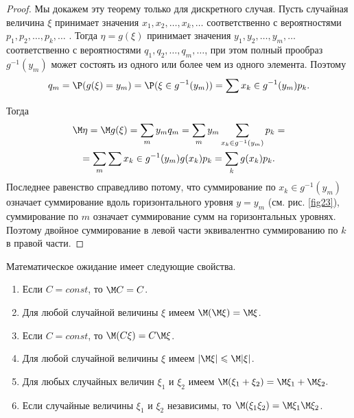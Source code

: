 \begin{proof}
	Мы докажем эту теорему только для дискретного случая.
Пусть случайная величина $\xi$ принимает значения $x_1, x_2,\dots, x_k, \dots$ соответственно с вероятностями $p_1, p_2,\dots , p_k,\dots$ . Тогда $\eta= g(\xi)$ принимает
значения $y_1, y_2, \dots , y_m, \dots$ соответственно с вероятностями $q_1, q_2,\dots, q_m,\dots $, при этом полный прообраз $g^{−1}(y_m)$ может состоять из одного или более чем из одного элемента. Поэтому
	\begin{equation*}
		q_m=\P(g(\xi)=y_m)=\P(\xi\in g^{-1}(y_m))=\sum\limits
		{x_k\in g^{-1}(y_m)}p_k.
	\end{equation*}

	Тогда
	\begin{gather*}
	\M\eta=\M g(\xi)=\sum_m y_mq_m=\sum_m y_m \sum
	\limits_{x_k\in g^{-1}(y_m)} p_k=\\=
	\sum_m\sum\limits{x_k\in g^{-1}(y_m)}g(x_k)p_k=\sum_kg(x_k)p_k.
	\end{gather*}
	Последнее равенство справедливо потому, что суммирование по $x_k\in g^{-1}(y_m)$ означает суммирование вдоль горизонтального уровня $y = y_m$ (см. рис. \ref{fig23}), суммирование по $m$ означает суммирование сумм на горизонтальных уровнях. Поэтому двойное суммирование в левой части эквивалентно суммированию по $k$ в правой части.
\end{proof}

\begin{theorem}
Математическое ожидание имеет следующие свойства.
\begin{enumerate}
	\item Если $C = const$, то $\M C = C$.
	\item Для любой случайной величины $\xi$ имеем $\M(\M\xi) = \M\xi$.
	\item Если $C = const$, то $\M(C\xi) = C\M\xi$.
	\item Для любой случайной величины $\xi$ имеем $|\M\xi| \leqslant \M|\xi|$. 
	\item Для любых случайных величин $\xi_1$ и $\xi_2$ имеем $\M(\xi_1 + \xi_2) = \M\xi_1 +\M\xi_2.$
	\item Если случайные величины $\xi_1$ и $\xi_2$ независимы, то $\M(\xi_1\xi_2) = \M\xi_1\M\xi_2$.
\end{enumerate}
\end{theorem}

